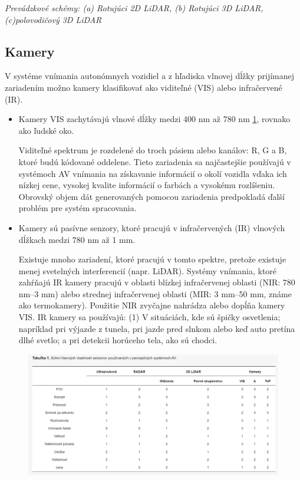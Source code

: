 \documentclass[10pt,oneside,slovak,a4paper]{article}
\begin{document}
\begin{center}
\centering
{
\emph{Prevádzkové schémy: (a) Rotujúci 2D LiDAR, (b) Rotujúci 3D LiDAR, 
(c)polovodičový 3D LiDAR}
}
\end{center}


\subsection{Kamery}
V systéme vnímania autonómnych vozidiel a z hľadiska vlnovej dĺžky prijímanej zariadením možno kamery klasifikovať ako viditeľné (VIS) alebo infračervené (IR). \cite{s19030648}

\begin{itemize}
\item Kamery VIS zachytávajú vlnové dĺžky medzi 400 nm až 780 nm \ref{fig:tabulka}, rovnako ako ľudské oko. \par Viditeľné spektrum je rozdelené do troch pásiem alebo kanálov: R, G a B, ktoré budú kódované oddelene. Tieto zariadenia sa najčastejšie používajú v systémoch AV vnímania na získavanie informácií o okolí vozidla vďaka ich nízkej cene, vysokej kvalite informácií o farbách a vysokému rozlíšeniu. Obrovský objem dát generovaných pomocou zariadenia predpokladá ďalší problém pre systém spracovania.

\item Kamery sú pasívne senzory, ktoré pracujú v infračervených (IR) vlnových dĺžkach medzi 780 nm až 1 mm.\par Existuje mnoho zariadení, ktoré pracujú v tomto spektre, pretože existuje menej svetelných interferencií (napr. LiDAR). Systémy vnímania, ktoré zahŕňajú IR kamery\cite{gade2014thermal,olmeda2011far}  pracujú v oblasti blízkej infračervenej oblasti (NIR: 780 nm–3 mm) alebo strednej infračervenej oblasti (MIR: 3 mm–50 mm, známe ako termokamery). Použitie NIR zvyčajne nahrádza alebo dopĺňa kamery VIS. IR kamery sa používajú: (1) V situáciách, kde sú špičky osvetlenia; napríklad pri výjazde z tunela, pri jazde pred slnkom alebo keď auto pretína dlhé svetlo; a pri detekcii horúceho tela, ako sú chodci. \cite{gonzalez2016pedestrian,sun2011night,john2015pedestrian}
\end{itemize}

\newpage

\begin{figure}[!h]
\centering
\includegraphics[scale=0.5]{tabulka.png}
\label{fig:tabulka}
\end{figure}
\end{document}
